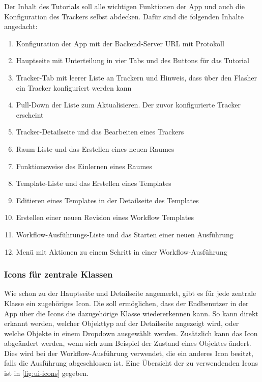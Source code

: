 \FloatBarrier

Der Inhalt des Tutorials soll alle wichtigen Funktionen der App und auch die Konfiguration des Trackers selbst abdecken.
Dafür sind die folgenden Inhalte angedacht:

\begin{enumerate}
	\item Konfiguration der App mit der Backend-Server URL mit Protokoll
	\item Hauptseite mit Unterteilung in vier Tabs und des Buttons für das Tutorial
	\item Tracker-Tab mit leerer Liste an Trackern und Hinweis, dass über den Flasher ein Tracker konfiguriert werden kann
	\item Pull-Down der Liste zum Aktualisieren. Der zuvor konfigurierte Tracker erscheint
	\item Tracker-Detailseite und das Bearbeiten eines Trackers
	\item Raum-Liste und das Erstellen eines neuen Raumes
	\item Funktionsweise des Einlernen eines Raumes
	\item Template-Liste und das Erstellen eines Templates
	\item Editieren eines Templates in der Detailseite des Templates
	\item Erstellen einer neuen Revision eines Workflow Templates
	\item Workflow-Ausführungs-Liste und das Starten einer neuen Ausführung
	\item Menü mit Aktionen zu einem Schritt in einer Workflow-Ausführung
\end{enumerate}

\subsubsection{Icons für zentrale Klassen}


Wie schon zu der Hauptseite und Detailseite angemerkt, gibt es für jede zentrale Klasse ein zugehöriges Icon.
Die soll ermöglichen, dass der Endbenutzer in der App über die Icons die dazugehörige Klasse wiedererkennen kann.
So kann direkt erkannt werden, welcher Objekttyp auf der Detailseite angezeigt wird, oder welche
Objekte in einem Dropdown ausgewählt werden.
Zusätzlich kann das Icon abgeändert werden, wenn sich zum Beispiel der Zustand eines Objektes ändert.
Dies wird bei der Workflow-Ausführung verwendet, die ein anderes Icon besitzt, falls die Ausführung abgeschlossen ist.
Eine Übersicht der zu verwendenden Icons ist in \autoref{fig:ui-icons} gegeben.

